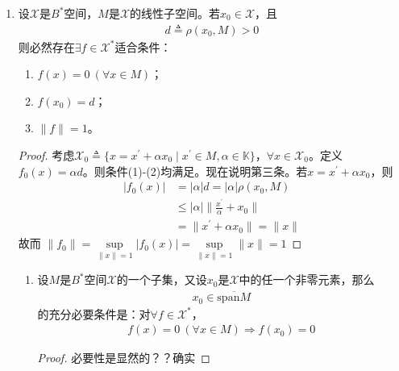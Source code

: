\begin{enumerate}[leftmargin=2cm, label=\arabic*]
\begin{enumerate}[leftmargin=1cm, label=(\arabic*)]
\begin{proof}
				在一般的$B^*$空间中，$\rho(x_0, M) =\inf\limits_{y\in M} \|x_0-y\|$。事实上，$\forall n\in N$以及 $\forall x_0\in \mathscr{X}$，按下确界定义，$\exists x_n\in M$，使得
				\begin{align*}
					\rho(x_0, M) \leqslant \rho(x_0, x_n) \leqslant \rho(x_0, M) + \frac{1}{n}
				\end{align*}
				因此
				\begin{align*}
					|f(x_0)| &= |f(x_n-x_0)| \leqslant \|f\| \|x_n-x_0\| \\
					&\leqslant  \|f\| \left( \rho(x_0, M) + \frac{1}{n}\right)
				\end{align*}
				令$n\to\infty$即得到结果。
			\end{proof}
		\end{enumerate}
		\item 设$\mathscr{X}$是$B^*$空间，$M$是$\mathscr{X}$的线性子空间。若$x_0\in\mathscr{X}$，且
		\begin{align*}
			d \triangleq \rho(x_0, M) > 0
		\end{align*}
		则必然存在$\exists f\in\mathscr{X}^*$适合条件：
		\begin{enumerate}[leftmargin=1cm, label=(\arabic*)]
			\item $f(x) = 0\ (\forall x\in M)$；
			\item $f(x_0) = d$；
			\item $\|f\| = 1$。
		\end{enumerate}
		\begin{proof}
			考虑$\mathscr{X}_0 \triangleq\{x = x^{\prime}+\alpha x_0\mid x^{\prime}\in M, \alpha\in\mathbb{K} \}$，$\forall x\in\mathscr{X}_0$。定义$f_0(x) = \alpha d$。则条件(1)-(2)均满足。现在说明第三条。若$x = x^{\prime} + \alpha x_0$，则
			\begin{align*}
				|f_0(x)| &= |\alpha| d = |\alpha|\rho(x_0, M) \\
				& \leqslant |\alpha| \| \frac{x^{\prime}}{\alpha} + x_0 \| \\
				& = \|x^{\prime} + \alpha x_0\| = \|x\|
			\end{align*}
			故而 $\|f_0\| = \sup\limits_{\|x\| = 1} |f_0(x)| = \sup\limits_{\|x\| = 1}\|x\| = 1$
		\end{proof}
		\begin{enumerate}[leftmargin=1cm, label=(\arabic*)]
			\item 设$M$是$B^*$空间$\mathscr{X}$的一个子集，又设$x_0$是$\mathscr{X}$中的任一个非零元素，那么
			\begin{align*}
				x_0\in\overline{\text{span}M}
			\end{align*}
			的充分必要条件是：对$\forall f\in\mathscr{X}^*$，
			\begin{align*}
				f(x) = 0\ (\forall x\in M) \Longrightarrow f(x_0) = 0
			\end{align*}
			\begin{proof}
				必要性是显然的？？确实
				

\end{proof}
\end{enumerate}
\end{enumerate}
